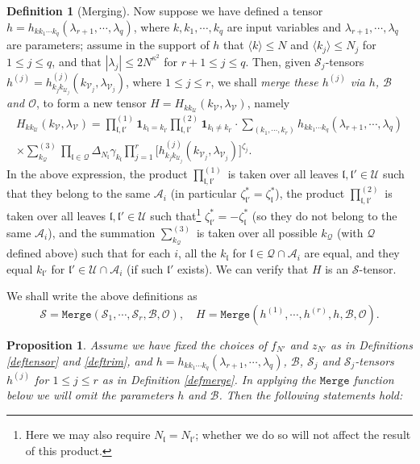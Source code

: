 \documentclass[11 pt,reqno]{amsart}
\newtheorem{prop}[thm]{Proposition}
\theoremstyle{definition}
\newtheorem{df}[thm]{Definition}
\theoremstyle{remark}
\numberwithin{equation}{section}
\newcommand{\Sc}{\mathcal{S}}
\newcommand{\Qc}{\mathcal{Q}}
\newcommand{\Uc}{\mathcal{U}}
\newcommand{\Ac}{\mathcal{A}}
\newcommand{\Vc}{\mathcal{V}}
\newcommand{\lf}{\mathfrak{l}}
\newcommand{\Bs}{\mathscr{B}}
\newcommand{\Os}{\mathscr{O}}
\begin{document}
{\begin{df}[Merging]
 Now suppose we have defined a tensor $h=h_{kk_1\cdots k_q}(\lambda_{r+1},\cdots,\lambda_{q})$, where $k,k_1,\cdots ,k_q$ are input variables and $\lambda_{r+1},\cdots,\lambda_{q}$ are parameters; assume in the support of $h$ that $\langle k\rangle\leq N$ and $\langle k_j\rangle\leq N_j$ for $1\leq j\leq q$, and that $|\lambda_j|\leq 2N^{\kappa^2}$ for $r+1\leq j\leq q$. Then, given $\Sc_j$-tensors $h^{(j)}=h_{k_jk_{\Uc_j}}^{(j)}(k_{\Vc_j},\lambda_{\Vc_j})$, where $1\leq j\leq r$, we shall \emph{merge these $h^{(j)}$ via $h$, $\Bs$ and $\Os$}, to form a new tensor $H=H_{kk_\Uc}(k_\Vc,\lambda_\Vc)$, namely
\begin{multline}\label{merge1}H_{kk_\Uc}(k_\Vc,\lambda_\Vc)=\prod_{\lf,\lf'}^{(1)}\mathbf{1}_{k_\lf=k_{\lf'}}\prod_{\lf,\lf'}^{(2)}\mathbf{1}_{k_\lf\neq k_{\lf'}}\cdot\sum_{(k_1,\cdots,k_r)}h_{kk_1\cdots k_q}(\lambda_{r+1},\cdots,\lambda_q)\\\times\sum_{k_{\Qc}}^{(3)}\prod_{\lf\in\Qc}\Delta_{N_\lf}\gamma_{k_\lf}\prod_{j=1}^{r}\big[h_{k_jk_{\Uc_j}}^{(j)}(k_{\Vc_j},\lambda_{\Vc_j})\big]^{\zeta_j}.
\end{multline}In the above expression, the product $\prod_{\lf,\lf'}^{(1)}$ is taken over all leaves $\lf,\lf'\in\Uc$ such that they belong to the same $\Ac_i$ (in particular $\zeta_{\lf'}^*=\zeta_{\lf}^*$), the product $\prod_{\lf,\lf'}^{(2)}$ is taken over all leaves $\lf,\lf'\in \Uc$ such that\footnote{Here we may also require $N_\lf=N_{\lf'}$; whether we do so will not affect the result of this product.} $\zeta_{\lf'}^*=-\zeta_{\lf}^*$ (so they do not belong to the same $\Ac_i$), and the summation $\sum_{k_{\Qc}}^{(3)}$ is taken over all possible $k_{\Qc}$ (with $\Qc$ defined above) such that for each $i$, all the $k_\lf$ for $\lf\in\Qc\cap\Ac_i$ are equal, and they equal $k_{\lf'}$ for $\lf'\in\Uc\cap\Ac_i$ (if such $\lf'$ exists). We can verify that $H$ is an $\Sc$-tensor.

We shall write the above definitions as \begin{equation}\label{merge2}\Sc=\mathtt{Merge}(\Sc_1,\cdots,\Sc_r,\Bs,\Os),\quad H=\mathtt{Merge}(h^{(1)},\cdots,h^{(r)},h,\Bs,\Os).\end{equation}
 \end{df}
 \begin{prop}\label{formulas} Assume we have fixed the choices of $f_{N'}$ and $z_{N'}$ as in Definitions \ref{deftensor} and \ref{deftrim}, and $h=h_{kk_1\cdots k_q}(\lambda_{r+1},\cdots,\lambda_{q})$, $\Bs$, $\Sc_j$ and $\Sc_j$-tensors $h^{(j)}$ for $1\leq j\leq r$ as in Definition \ref{defmerge}. In applying the $\mathtt{Merge}$ function below we will omit the parameters $h$ and $\Bs$. Then the following statements hold:
 

\end{prop}}
\end{document}
